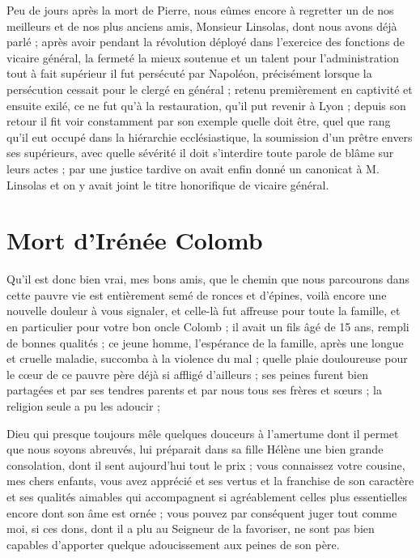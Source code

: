 \documentclass[11pt,a4paper]{report}
\begin{document}
Peu de jours après la mort de Pierre, nous eûmes encore à regretter un de nos meilleurs et de nos plus anciens amis, Monsieur Linsolas, dont nous avons déjà parlé ; après avoir pendant la révolution déployé dans l'exercice des fonctions de vicaire général, la fermeté la mieux soutenue et un talent pour l'administration tout à fait supérieur il fut persécuté par Napoléon, précisément lorsque la persécution cessait pour le clergé en général ; retenu premièrement en captivité et ensuite exilé, ce ne fut qu'à la restauration, qu'il put revenir à Lyon ; depuis son retour il fit voir constamment par son exemple quelle doit être, quel que rang qu'il eut occupé dans la hiérarchie ecclésiastique, la soumission d'un prêtre envers ses supérieurs, avec quelle sévérité il doit s'interdire toute parole de blâme sur leurs actes ; par une justice tardive on avait enfin donné un canonicat à M. Linsolas et on y avait joint le titre honorifique de vicaire général.

\section*{Mort d'Irénée Colomb}

Qu'il est donc bien vrai, mes bons amis, que le chemin que nous parcourons dans cette pauvre vie est entièrement semé de ronces et d'épines, voilà encore une nouvelle douleur à vous signaler, et celle-là fut affreuse pour toute la famille, et en particulier pour votre bon oncle Colomb ; il avait un fils âgé de 15 ans, rempli de bonnes qualités ; ce jeune homme, l'espérance de la famille, après une longue et cruelle maladie, succomba à la violence du mal ; quelle plaie douloureuse pour le cœur de ce pauvre père déjà si affligé d'ailleurs ; ses peines furent bien partagées et par ses tendres parents et par nous tous ses frères et sœurs ; la religion seule a pu les adoucir ;

Dieu qui presque toujours mêle quelques douceurs à l'amertume dont il permet que nous soyons abreuvés, lui préparait dans sa fille Hélène une bien grande consolation, dont il sent aujourd'hui tout le prix ; vous connaissez votre cousine, mes chers enfants, vous avez apprécié et ses vertus et la franchise de son caractère et ses qualités aimables qui accompagnent si agréablement celles plus essentielles encore dont son âme est ornée ; vous pouvez par conséquent juger tout comme moi, si ces dons, dont il a plu au Seigneur de la favoriser, ne sont pas bien capables d'apporter quelque adoucissement aux peines de son père.
\end{document}
